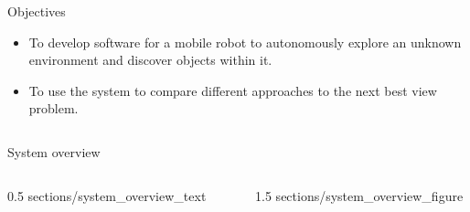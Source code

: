 \documentclass[final]{beamer}
\newlength{\sepwid}
\newlength{\onecolwid}
\newlength{\twocolwid}
\begin{document}
\begin{frame}[t]
\begin{columns}[t]
\begin{column}{\twocolwid}
\begin{columns}[t,totalwidth=\twocolwid]
\begin{column}{\onecolwid}
\begin{alertblock}{Objectives}
			\begin{itemize}
				\item To develop software for a mobile robot to autonomously explore an unknown environment and discover objects within it.
				\item To use the system to compare different approaches to the next best view problem.
			\end{itemize}

			\end{alertblock}

		\end{column}

	\end{columns}






	\begin{block}{System overview}

	\begin{columns}[c,totalwidth=\twocolwid]

		\begin{column}{0.5\onecolwid}
			{sections/system_overview_text}
		\end{column}

		\begin{column}{\sepwid}
		\end{column} %

		\begin{column}{1.5\onecolwid}
			{sections/system_overview_figure}
		\end{column}


\end{columns}
\end{block}
\end{column}
\end{columns}
\end{frame}
\end{document}
